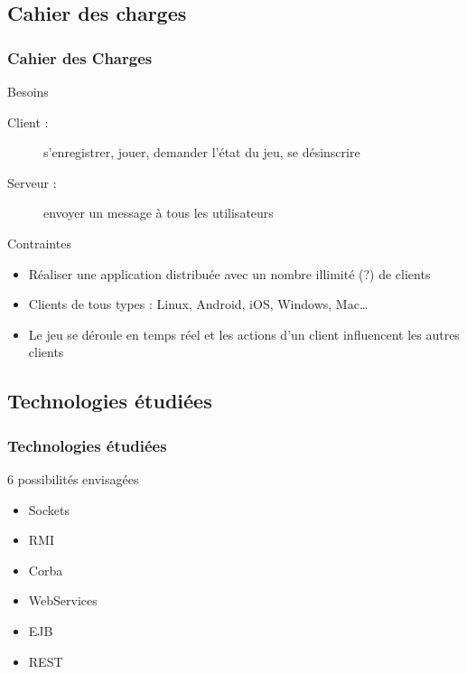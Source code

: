 \begin{frame}[c]
\end{frame}

\subsection{Cahier des charges}
\begin{frame}[c]
	\frametitle{Cahier des Charges}
	\begin{block}{Besoins}
		\begin{description}
			\item[Client :] s'enregistrer, jouer, demander l'état du jeu, se désinscrire
			\item[Serveur :] envoyer un message à tous les utilisateurs
		\end{description}
	\end{block}
	\begin{block}{Contraintes}
		\begin{itemize}
			\item Réaliser une application distribuée avec un nombre illimité (?) de clients
			\item Clients de tous types : Linux, Android, iOS, Windows, Mac\dots{}
			\item Le jeu se déroule en temps réel et les actions d'un client influencent les autres clients
		\end{itemize}
	\end{block}
\end{frame}

\subsection{Technologies étudiées}
\begin{frame}[c]
	\frametitle{Technologies étudiées}
	\begin{block}{6 possibilités envisagées}
		\begin{itemize}
			\item Sockets
			\item RMI
			\item Corba
			\item WebServices
			\item EJB
			\item REST
		\end{itemize}
	\end{block}
\end{frame}

